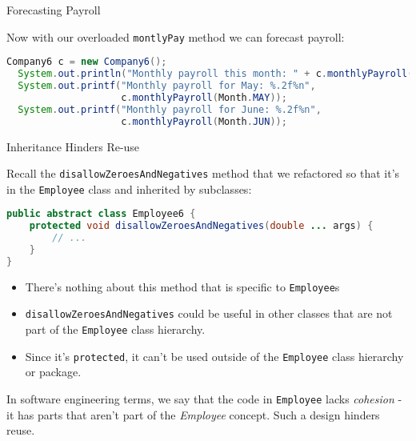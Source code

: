 \documentclass{beamer}
\begin{document}
\begin{frame}[fragile]{Forecasting Payroll}


Now with our overloaded  {\tt montlyPay} method we can forecast payroll:
\begin{lstlisting}[language=Java]
  Company6 c = new Company6();
  System.out.println("Monthly payroll this month: " + c.monthlyPayroll());
  System.out.printf("Monthly payroll for May: %.2f%n",
                    c.monthlyPayroll(Month.MAY));
  System.out.printf("Monthly payroll for June: %.2f%n",
                    c.monthlyPayroll(Month.JUN));
\end{lstlisting}


\end{frame}

\begin{frame}[fragile]{Inheritance Hinders Re-use}

Recall the {\tt disallowZeroesAndNegatives} method that we refactored so that it's in the {\tt Employee} class and inherited by subclasses:
\vspace{-.05in}
\begin{lstlisting}[language=Java]
public abstract class Employee6 {
    protected void disallowZeroesAndNegatives(double ... args) {
        // ...
    }
}
\end{lstlisting}

\begin{itemize}
\item There's nothing about this method that is specific to {\tt Employee}s
\item {\tt disallowZeroesAndNegatives} could be useful in other classes that are not part of the {\tt Employee} class hierarchy.
\item Since it's {\tt protected}, it can't be used outside of the {\tt Employee} class hierarchy or package. 
\end{itemize}

In software engineering terms, we say that the code in {\tt Employee} lacks {\it cohesion} - it has parts that aren't part of the {\it Employee} concept.  Such a design hinders reuse.

\end{frame}
\end{document}
